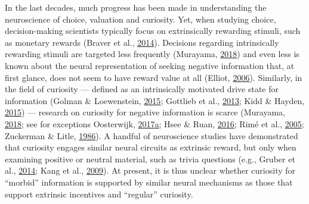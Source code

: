 \documentclass[11pt,american,a4paper,oneside,]{memoir} %
\begin{document}
In the last decades, much progress has been made in understanding the neuroscience of choice, valuation and curiosity. Yet, when studying choice, decision-making scientists typically focus on extrinsically rewarding stimuli, such as monetary rewards (Braver et al., \protect\hyperlink{ref-braver2014mechanisms}{2014}). Decisions regarding intrinsically rewarding stimuli are targeted less frequently (Murayama, \protect\hyperlink{ref-murayama2018psychological}{2018}) and even less is known about the neural representation of seeking negative information that, at first glance, does not seem to have reward value at all (Elliot, \protect\hyperlink{ref-elliot2006hierarchical}{2006}). Similarly, in the field of curiosity --- defined as an intrinsically motivated drive state for information (Golman \& Loewenstein, \protect\hyperlink{ref-golman2015curiosity}{2015}; Gottlieb et al., \protect\hyperlink{ref-gottlieb2013information}{2013}; Kidd \& Hayden, \protect\hyperlink{ref-kidd2015psychology}{2015}) --- research on curiosity for negative information is scarce (Murayama, \protect\hyperlink{ref-murayama2018psychological}{2018}; see for exceptions Oosterwijk, \protect\hyperlink{ref-oosterwijk2017choosing}{2017}\protect\hyperlink{ref-oosterwijk2017choosing}{a}; Hsee \& Ruan, \protect\hyperlink{ref-hsee2016pandora}{2016}; Rimé et al., \protect\hyperlink{ref-rime2005brief}{2005}; Zuckerman \& Litle, \protect\hyperlink{ref-zuckerman1986personality}{1986}). A handful of neuroscience studies have demonstrated that curiosity engages similar neural circuits as extrinsic reward, but only when examining positive or neutral material, such as trivia questions (e.g., Gruber et al., \protect\hyperlink{ref-gruber2014states}{2014}; Kang et al., \protect\hyperlink{ref-kang2009wick}{2009}). At present, it is thus unclear whether curiosity for ``morbid'' information is supported by similar neural mechanisms as those that support extrinsic incentives and ``regular'' curiosity.
\end{document}
